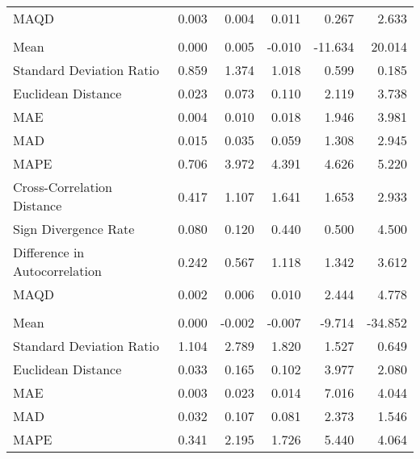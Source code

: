 \begin{landscape}
\begin{ThreePartTable}
\begin{longtable}[t]{lrrrrr}
\hspace{1em}MAQD & 0.003 & 0.004 & 0.011 & 0.267 & 2.633\\
\addlinespace[0.5em]
\multicolumn{6}{l}{\textbf{HUN}}\\
\hline
\hspace{1em}Mean & 0.000 & 0.005 & -0.010 & -11.634 & 20.014\\
\hspace{1em}Standard Deviation Ratio & 0.859 & 1.374 & 1.018 & 0.599 & 0.185\\
\hspace{1em}Euclidean Distance & 0.023 & 0.073 & 0.110 & 2.119 & 3.738\\
\hspace{1em}MAE & 0.004 & 0.010 & 0.018 & 1.946 & 3.981\\
\hspace{1em}MAD & 0.015 & 0.035 & 0.059 & 1.308 & 2.945\\
\hspace{1em}MAPE & 0.706 & 3.972 & 4.391 & 4.626 & 5.220\\
\hspace{1em}Cross-Correlation Distance & 0.417 & 1.107 & 1.641 & 1.653 & 2.933\\
\hspace{1em}Sign Divergence Rate & 0.080 & 0.120 & 0.440 & 0.500 & 4.500\\
\hspace{1em}Difference in Autocorrelation & 0.242 & 0.567 & 1.118 & 1.342 & 3.612\\
\hspace{1em}MAQD & 0.002 & 0.006 & 0.010 & 2.444 & 4.778\\
\addlinespace[0.5em]
\multicolumn{6}{l}{\textbf{IDN}}\\
\hline
\hspace{1em}Mean & 0.000 & -0.002 & -0.007 & -9.714 & -34.852\\
\hspace{1em}Standard Deviation Ratio & 1.104 & 2.789 & 1.820 & 1.527 & 0.649\\
\hspace{1em}Euclidean Distance & 0.033 & 0.165 & 0.102 & 3.977 & 2.080\\
\hspace{1em}MAE & 0.003 & 0.023 & 0.014 & 7.016 & 4.044\\
\hspace{1em}MAD & 0.032 & 0.107 & 0.081 & 2.373 & 1.546\\
\hspace{1em}MAPE & 0.341 & 2.195 & 1.726 & 5.440 & 4.064\\

\end{longtable}
\end{ThreePartTable}
\end{landscape}
